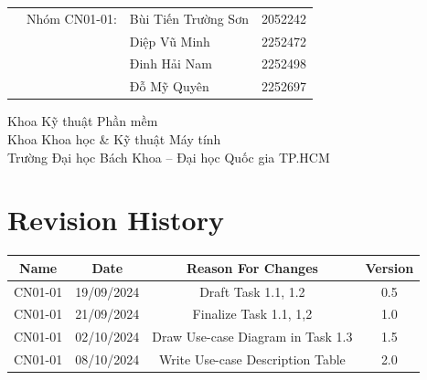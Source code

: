 \begin{titlepage}
\begin{table}[h]
\begin{tabular}{rrll}
			              & Nhóm CN01-01:         & Bùi Tiến Trường Sơn & 2052242 \\
			              &                       & Diệp Vũ Minh        & 2252472 \\
			              &                       & Đinh Hải Nam        & 2252498 \\
			              &                       & Đỗ Mỹ Quyên         & 2252697 \\
		\end{tabular}
	\end{table}

	\vspace{2cm}

	\begin{flushright}
		\begin{minipage}{0.8\textwidth}
			\raggedleft
			\large
			Khoa Kỹ thuật Phần mềm \\
			Khoa Khoa học \& Kỹ thuật Máy tính \\
			Trường Đại học Bách Khoa – Đại học Quốc gia TP.HCM
		\end{minipage}
	\end{flushright}

\end{titlepage}


\newpage
\tableofcontents

\section*{Revision History}

\begin{longtable}{|c|c|c|c|}
	\hline
	\textbf{Name} & \textbf{Date} & \textbf{Reason For Changes}       & \textbf{Version} \\ \hline\hline
	CN01-01       & 19/09/2024    & Draft Task 1.1, 1.2               & 0.5              \\ \hline
	CN01-01       & 21/09/2024    & Finalize Task 1.1, 1,2            & 1.0              \\ \hline
	CN01-01       & 02/10/2024    & Draw Use-case Diagram in Task 1.3 & 1.5              \\ \hline
	CN01-01       & 08/10/2024    & Write Use-case Description Table  & 2.0              \\ \hline
\end{longtable}

